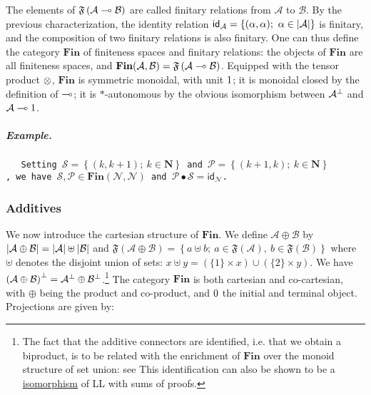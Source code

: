The elements of
\(\mathfrak F\left({\mathcal A}\multimap{\mathcal B}\right)\) are called
finitary relations from \({\mathcal A}\) to \({\mathcal B}\). By the
previous characterization, the identity relation
\(\mathsf{id}_{{\mathcal A}} = \left\{(\alpha,\alpha);\  \alpha\in\left|{\mathcal A}\right|\right\}\)
is finitary, and the composition of two finitary relations is also
finitary. One can thus define the category \(\mathbf{Fin}\) of
finiteness spaces and finitary relations: the objects of
\(\mathbf{Fin}\) are all finiteness spaces, and
\(\mathbf{Fin}({\mathcal A},{\mathcal B})=\mathfrak F\left({\mathcal A}\multimap{\mathcal B}\right)\).
Equipped with the tensor product \(\otimes\), \(\mathbf{Fin}\) is
symmetric monoidal, with unit \(1\); it is monoidal closed by the
definition of \(\multimap\); it is \(*\)-autonomous by the obvious
isomorphism between \({\mathcal A}^\bot\) and \({\mathcal A}\multimap1\).

\subparagraph{Example.}\label{example.-1}

\texttt{~~~Setting~}\(\mathcal{S}=\left\{(k,k+1);\  k\in{\mathbf N}\right\}\)\texttt{~and~}\(\mathcal{P}=\left\{(k+1,k);\  k\in{\mathbf N}\right\}\)\texttt{,~we~have~}\(\mathcal{S},\mathcal{P}\in\mathbf{Fin}({\mathcal N},{\mathcal N})\)\texttt{~and~}\(\mathcal{P}\bullet\mathcal{S}=\mathsf{id}_{{\mathcal N}}\)\texttt{.}

\subsubsection{Additives}\label{additives}

We now introduce the cartesian structure of \(\mathbf{Fin}\). We define
\({\mathcal A} \oplus {\mathcal B}\) by
\(\left|{\mathcal A} \oplus {\mathcal B}\right| = \left|\mathcal A\right| \uplus \left|\mathcal B\right|\)
and
\(\mathfrak F\left({\mathcal A} \oplus {\mathcal B}\right) = \left\{ a\uplus b;\  a\in \mathfrak F\left(\mathcal A\right),\ b\in\mathfrak F\left(\mathcal B\right)\right\}\)
where \(\uplus\) denotes the disjoint union of sets:
\(x\uplus y=(\{1\}\times x)\cup(\{2\}\times y)\). We have
\(\left({\mathcal A}\oplus {\mathcal B}\right)^\bot = {\mathcal A}^\bot\oplus{\mathcal B}^\bot\).\footnote{The
  fact that the additive connectors are identified, i.e. that we obtain
  a biproduct, is to be related with the enrichment of \(\mathbf{Fin}\)
  over the monoid structure of set union: see This identification can
  also be shown to be a \url{isomorphism} of LL with sums of proofs.}
The category \(\mathbf{Fin}\) is both cartesian and co-cartesian, with
\(\oplus\) being the product and co-product, and \(0\) the initial
and terminal object. Projections are given by:

